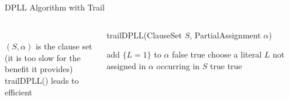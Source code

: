 \documentclass[t]{sdqbeamer}
\begin{document}
\begin{frame}{DPLL Algorithm with Trail}
\begin{block}{}
\begin{columns}[T]
\begin{column}{.2\linewidth}
~\\[1em]
$(S,\alpha)$ is the clause set \\[1em]
 (it is too slow for the benefit it provides)\\[1em]
\textsf{trailDPLL()} leads to efficient 
\end{column}
\begin{column}{.7\linewidth}
\begin{algorithm}[H]
\DontPrintSemicolon
\caption{trailDPLL(ClauseSet $S$, PartialAssignment $\alpha$)}
	 {
		add $\{ L = 1 \}$ to $\alpha$ 
	}
	 { 
		\Return false  
	}
	 { 
		\Return true  
	}
	choose a literal $L$ not assigned in $\alpha$ occurring in $S$ 
	 { 
		\Return true  
	}
	 { 
		\Return true  
	}
\end{algorithm}
\end{column}
\end{columns}
\end{block}
\end{frame}
\end{document}
